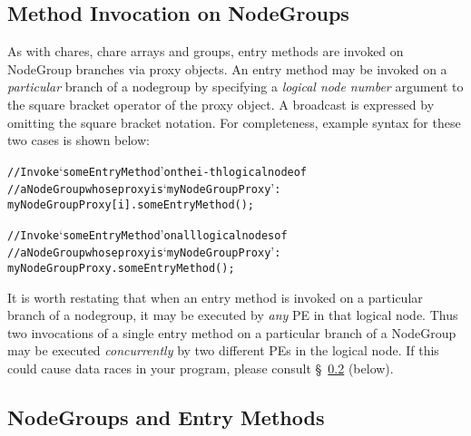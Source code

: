 \subsection{Method Invocation on NodeGroups}

As with chares, chare arrays and groups, entry methods are invoked on
NodeGroup branches via proxy objects. 
An entry method may be invoked on a {\em particular} branch of a
nodegroup by specifying a {\em logical node number} argument
to the square bracket operator of the proxy object. A broadcast is expressed
by omitting the square bracket notation. For completeness, example syntax for these
two cases is shown below:

\begin{alltt}
 // Invoke `someEntryMethod' on the i-th logical node of
 // a NodeGroup whose proxy is `myNodeGroupProxy':
 myNodeGroupProxy[i].someEntryMethod();

 // Invoke `someEntryMethod' on all logical nodes of
 // a NodeGroup whose proxy is `myNodeGroupProxy':
 myNodeGroupProxy.someEntryMethod();
\end{alltt}

It is worth restating that when an entry method is
invoked on a particular branch of a nodegroup,
it may be executed by {\em any} PE in that logical node. Thus two invocations of
a single entry method on a particular branch of a
NodeGroup may be executed {\em concurrently} by two
different PEs in the logical node. If this could cause data races in your
program, please consult \S~\ref{sec:nodegroups/exclusive} (below).


\subsection{NodeGroups and  Entry Methods}
\label{sec:nodegroups/exclusive}

